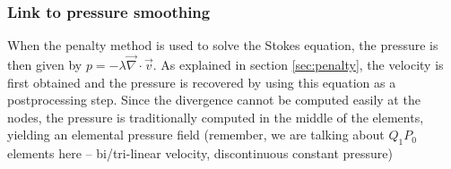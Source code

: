 \subsubsection{Link to pressure smoothing}

When the penalty method is used to solve the Stokes equation, the pressure
is then given by $p=-\lambda \vec\nabla \cdot \vec v$. As explained in 
section \ref{sec:penalty}, the velocity is first obtained and the pressure 
is recovered by using this equation as a postprocessing step. Since the divergence 
cannot be computed easily at the nodes, the pressure is traditionally computed 
in the middle of the elements, yielding an elemental pressure field (remember, 
we are talking about $Q_1P_0$ elements here -- bi/tri-linear velocity, discontinuous
constant pressure)




